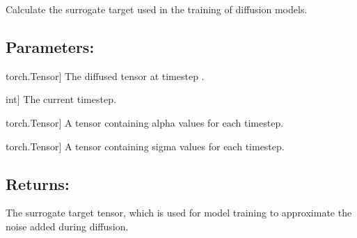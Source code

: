 \documentclass[a4paper,10pt,english]{sphinxmanual}
\begin{document}
\begin{fulllineitems}
\end{fulllineitems}


\begin{fulllineitems}
\label{\detokenize{models:fireDiff.Models.utils.surrogate_target}}
\pysigstartsignatures
{}
\pysigstopsignatures
\sphinxAtStartPar
Calculate the surrogate target used in the training of diffusion models.


\subsection{Parameters:}
\label{\detokenize{models:id56}}\begin{description}
\sphinxlineitem{x\_t}{[}torch.Tensor{]}
\sphinxAtStartPar
The diffused tensor at timestep .

\sphinxlineitem{t}{[}int{]}
\sphinxAtStartPar
The current timestep.

\sphinxlineitem{alpha}{[}torch.Tensor{]}
\sphinxAtStartPar
A tensor containing alpha values for each timestep.

\sphinxlineitem{sigma}{[}torch.Tensor{]}
\sphinxAtStartPar
A tensor containing sigma values for each timestep.

\end{description}


\subsection{Returns:}
\label{\detokenize{models:id57}}\begin{description}
\sphinxAtStartPar
The surrogate target tensor, which is used for model training to
approximate the noise added during diffusion.

\end{description}



\end{fulllineitems}
\end{document}
